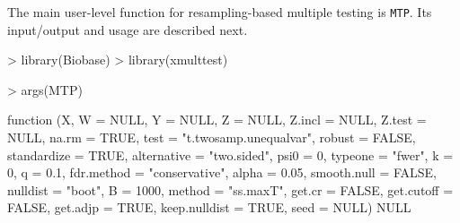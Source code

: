 \documentclass[11pt]{article}
\newcommand{\Robject}[1]{\texttt{#1}}
\begin{document}
The main user-level function for resampling-based multiple testing is \Robject{MTP}. Its input/output and usage are described next. 

\begin{Schunk}
\begin{Sinput}
> library(Biobase)
> library(xmulttest)
\end{Sinput}
\end{Schunk}

\begin{Schunk}
\begin{Sinput}
> args(MTP)
\end{Sinput}
\begin{Soutput}
function (X, W = NULL, Y = NULL, Z = NULL, Z.incl = NULL, Z.test = NULL, 
    na.rm = TRUE, test = "t.twosamp.unequalvar", robust = FALSE, 
    standardize = TRUE, alternative = "two.sided", psi0 = 0, 
    typeone = "fwer", k = 0, q = 0.1, fdr.method = "conservative", 
    alpha = 0.05, smooth.null = FALSE, nulldist = "boot", B = 1000, 
    method = "ss.maxT", get.cr = FALSE, get.cutoff = FALSE, get.adjp = TRUE, 
    keep.nulldist = TRUE, seed = NULL) 
NULL
\end{Soutput}
\end{Schunk}
\end{document}
